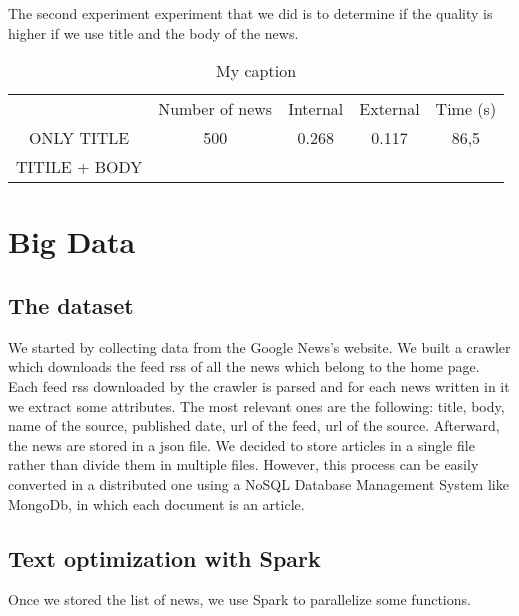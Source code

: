 \documentclass{acm_proc_article-sp}
\begin{document}
The second experiment experiment that we did is to determine if the quality is higher if we use title and the body of the news.

\begin{table}[]
\centering
\caption{My caption}
\label{my-label}
\begin{tabular}{ccccc}
              & Number of news & Internal & External & Time (s) \\
ONLY TITLE    & 500            & 0.268    & 0.117    & 86,5     \\
TITILE + BODY &                &          &          &         
\end{tabular}
\end{table}


\section{Big Data}
\vspace{2mm}

\subsection{The dataset}
\vspace{2mm}
We started by collecting data from the Google News's website. We built a crawler which downloads the feed rss of all the news which belong to the home page. 
Each feed rss downloaded by the crawler is parsed and for each news written in it we extract some attributes. The most relevant ones are the following: title, body, name of the source, published date, url of the feed, url of the source.
Afterward, the news are stored in a json file. We decided to store articles in a single file rather than divide them in multiple files. However, this process can be easily converted in a distributed one using a NoSQL Database Management System like MongoDb, in which each document is an article.

\subsection{Text optimization with Spark}

Once we stored the list of news, we use Spark to parallelize some functions.


\end{document}
